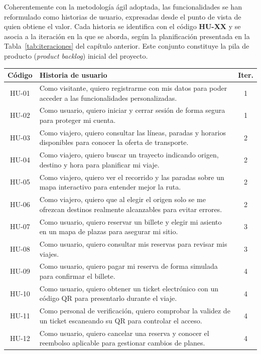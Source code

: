 Coherentemente con la metodología ágil adoptada, las funcionalidades se han reformulado como historias de usuario, expresadas desde el punto de vista de quien obtiene el valor. Cada historia se identifica con el código \textbf{HU-XX} y se asocia a la iteración en la que se aborda, según la planificación presentada en la Tabla~\ref{tab:iteraciones} del capítulo anterior. Este conjunto constituye la pila de producto (\textit{product backlog}) inicial del proyecto.

\begin{table}[h!]
\centering
\small
\begin{tabular}{|c|p{10cm}|c|}
\hline
\textbf{Código} & \textbf{Historia de usuario} & \textbf{Iter.} \\ \hline
HU-01 & Como visitante, quiero registrarme con mis datos para poder acceder a las funcionalidades personalizadas. & 1 \\ \hline
HU-02 & Como usuario, quiero iniciar y cerrar sesión de forma segura para proteger mi cuenta. & 1 \\ \hline
HU-03 & Como viajero, quiero consultar las líneas, paradas y horarios disponibles para conocer la oferta de transporte. & 2 \\ \hline
HU-04 & Como viajero, quiero buscar un trayecto indicando origen, destino y hora para planificar mi viaje. & 2 \\ \hline
HU-05 & Como viajero, quiero ver el recorrido y las paradas sobre un mapa interactivo para entender mejor la ruta. & 2 \\ \hline
HU-06 & Como viajero, quiero que al elegir el origen solo se me ofrezcan destinos realmente alcanzables para evitar errores. & 2 \\ \hline
HU-07 & Como usuario, quiero reservar un billete y elegir mi asiento en un mapa de plazas para asegurar mi sitio. & 3 \\ \hline
HU-08 & Como usuario, quiero consultar mis reservas para revisar mis viajes. & 3 \\ \hline
HU-09 & Como usuario, quiero pagar mi reserva de forma simulada para confirmar el billete. & 4 \\ \hline
HU-10 & Como usuario, quiero obtener un ticket electrónico con un código QR para presentarlo durante el viaje. & 4 \\ \hline
HU-11 & Como personal de verificación, quiero comprobar la validez de un ticket escaneando su QR para controlar el acceso. & 4 \\ \hline
HU-12 & Como usuario, quiero cancelar una reserva y conocer el reembolso aplicable para gestionar cambios de planes. & 4 \\ \hline

\end{tabular}
\end{table}
